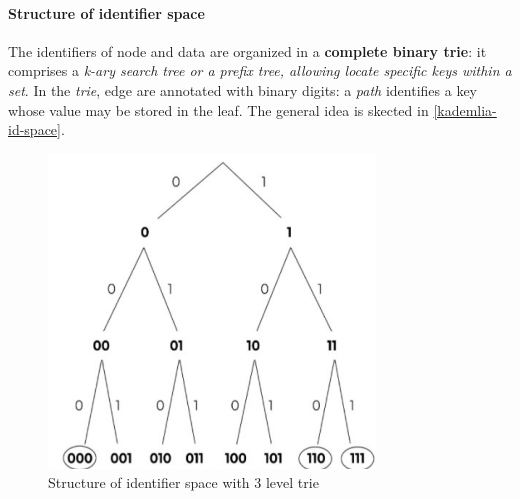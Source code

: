 \documentclass[10pt,a4paper]{report}
\begin{document}
\paragraph{Structure of identifier space}\label{sec:structure-of-identifier-space}
The identifiers of node and data are organized in a \textbf{complete binary trie}: it comprises a \textit{k-ary search tree or a prefix tree, allowing locate specific keys within a set}.
In the \textit{trie}, edge are annotated with binary digits: a \textit{path} identifies a key whose value may be stored in the leaf. The general idea is skected in \ref{kademlia-id-space}. 
\begin{figure}[h]
	\centering
	\includegraphics[scale=0.50]{images/Pasted image 20230303142817.png}
	\caption{Structure of identifier space with 3 level trie}
	\label{kamdelia-id-space}
\end{figure}
\end{document}
